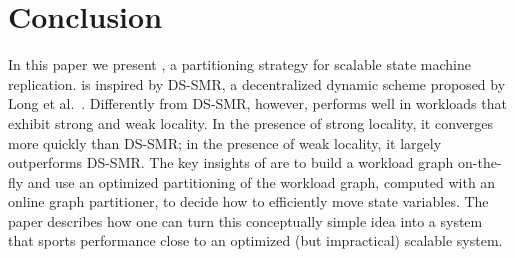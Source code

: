 \section{Conclusion}
\label{sec:conclusion}

In this paper we present \dynastar, a partitioning strategy for scalable state machine replication.
\dynastar is inspired by DS-SMR, a decentralized dynamic scheme proposed by Long et al.~\cite{hoang2016}.
Differently from DS-SMR, however, \dynastar performs well in workloads that exhibit strong and weak locality.
In the presence of strong locality, it converges more quickly than DS-SMR; in the presence of weak locality, it largely outperforms DS-SMR.
The key insights of \dynastar are to build a workload graph on-the-fly and use an optimized partitioning of the workload graph, computed with an online graph partitioner, to decide how to efficiently move state variables.
The paper describes how one can turn this conceptually simple idea into a system that sports performance close to an optimized (but impractical) scalable system.
